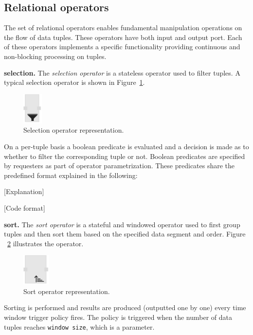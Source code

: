 \subsection{Relational operators}
The set of relational operators enables fundamental manipulation operations on 
the flow of data tuples. These operators have both input and output port. Each of 
these operators implements a specific functionality providing continuous and 
non-blocking processing on tuples.

\textbf{selection.}
The \textit{selection operator} is a stateless operator used to filter tuples. A typical 
selection operator is shown in Figure~\ref{fig:selection operator}.

\begin{figure}[ht]
	\centering
	\includegraphics[height=60px]{figures/SelectionOperator.pdf}
	\caption{Selection operator representation.}
	\label{fig:selection operator}
\end{figure}

On a per-tuple basis a boolean predicate is evaluated and a decision is made as 
to whether to filter the corresponding tuple or not. Boolean predicates are specified 
by requesters as part of operator parametrization. These predicates share the 
predefined format explained in the following:

[Explanation]

[Code format]

\textbf{sort.}
The \textit{sort operator} is a stateful and windowed operator used to first group 
tuples and then sort them based on the specified data segment and order. Figure
~\ref{fig:sort operator} illustrates the operator.

\begin{figure}[ht]
	\centering
	\includegraphics[height=60px]{figures/SortOperator.pdf}
	\caption{Sort operator representation.}
	\label{fig:sort operator}
\end{figure}

Sorting is performed and results are produced (outputted one by one) every time 
window trigger policy fires. The policy is triggered when the number of data tuples 
reaches \texttt{window size}, which is a parameter. 


